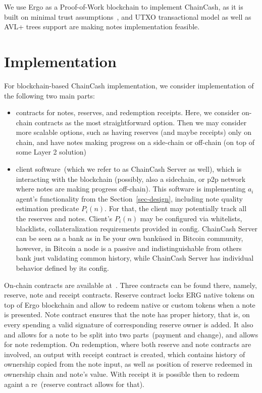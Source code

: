 \documentclass{article}   %
\newcommand{\cc}{ChainCash}
\begin{document}
We use Ergo as a Proof-of-Work blockchain to implement \cc{}, as it is built on minimal trust assumptions~\cite{kya}, and UTXO transactional model as well as AVL+ trees support are making notes implementation feasible.


\section{Implementation}

For blockchain-based \cc{} implementation, we consider implementation of the following two main parts:

\begin{itemize}
  \item{} contracts for notes, reserves, and redemption receipts. Here, we consider on-chain contracts as the most
  straightforward option. Then we may consider more scalable options, such as having reserves (and maybe receipts) only
  on chain, and have notes making progress on a side-chain or off-chain (on top of some Layer 2 solution)
  \item{} client software~(which we refer to as \cc{} Server as well), which is interacting with the blockchain (possibly, also a sidechain, or p2p network
  where notes are making progress off-chain). This software is implementing $a_i$ agent's functionality from the Section~\ref{sec-design},
  including note quality estimation predicate $P_i(n)$. For that, the client may potentially track all the reserves and notes.
  Client's $P_i(n)$ may be configured via whitelists, blacklists, collateralization requirements provided in config.
  \cc{} Server can be seen as a bank as in \"be your own bank\" used in Bitcoin community, however, in Bitcoin a node
  is a passive and indistinguishable from others bank just validating common history, while \cc{} Server has individual behavior defined by its config.
\end{itemize}

On-chain contracts are available at~\cite{contracts}. Three contracts can be found there, namely, reserve, note and receipt contracts. Reserve contract locks ERG native tokens on top of Ergo blockchain and allow to redeem native or custom tokens when a note is presented. Note contract ensures that the note has proper history, that is, on every spending a valid signature of corresponding reserve owner is added. It also and allows for a note to be split into two parts~(payment and change), and allows for note redemption.
On redemption, where both reserve and note contracts are involved, an output with receipt contract is created, which contains history of ownership copied from the note input, as well as position of reserve redeemed in ownership chain and note's value. With receipt it is possible then to redeem againt a re~(reserve contract allows for that).
\end{document}
